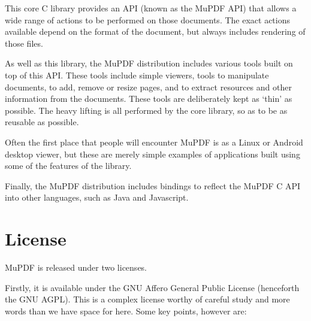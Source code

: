 \documentclass[oneside]{book}
\begin{document}
This core C library provides an API (known as the MuPDF API) that allows a wide range of actions to be performed on those documents. The exact actions available depend on the format of the document, but always includes rendering of those files.

As well as this library, the MuPDF distribution includes various tools built on top of this API. These tools include simple viewers, tools to manipulate documents, to add, remove or resize pages, and to extract resources and other information from the documents. These tools are deliberately kept as `thin' as possible. The heavy lifting is all performed by the core library, so as to be as reusable as possible.

Often the first place that people will encounter MuPDF is as a Linux or Android desktop viewer, but these are merely simple examples of applications built using some of the features of the library.

Finally, the MuPDF distribution includes bindings to reflect the MuPDF C API into other languages, such as Java and Javascript.


\section{License}

MuPDF is released under two licenses.

Firstly, it is available under the GNU Affero General Public License (henceforth the GNU AGPL). This is a complex license worthy of careful study and more words than we have space for here. Some key points, however are:
\end{document}
